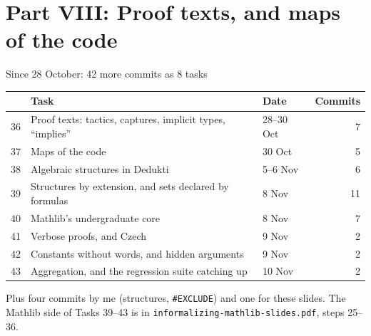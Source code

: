 \documentclass[10pt,aspectratio=169]{beamer}
\begin{document}
\section{Part VIII: Proof texts, and maps of the code}

\begin{frame}{Since 28 October: 42 more commits as 8 tasks}
  \footnotesize
  \begin{tabular}{rllr}
    \toprule
    & \textbf{Task} & \textbf{Date} & \textbf{Commits} \\
    \midrule
    36 & Proof texts: tactics, captures, implicit types, ``implies'' & 28--30 Oct & 7 \\
    37 & Maps of the code & 30 Oct & 5 \\
    \midrule
    38 & Algebraic structures in Dedukti & 5--6 Nov & 6 \\
    39 & Structures by extension, and sets declared by formulas & 8 Nov & 11 \\
    \midrule
    40 & Mathlib's undergraduate core & 8 Nov & 7 \\
    41 & Verbose proofs, and Czech & 9 Nov & 2 \\
    42 & Constants without words, and hidden arguments & 9 Nov & 2 \\
    43 & Aggregation, and the regression suite catching up & 10 Nov & 2 \\
    \bottomrule
  \end{tabular}

  \vspace{0.5em}
  Plus four commits by me (structures, \texttt{\#EXCLUDE}) and one for these slides.
  The Mathlib side of Tasks 39--43 is in \texttt{informalizing-mathlib-slides.pdf}, steps 25--36.
\end{frame}
\end{document}
